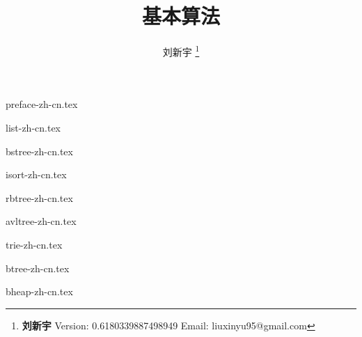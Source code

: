 \documentclass[zihao=5, b5paper, twoside, heading=true]{ctexbook}
\begin{document}


\title{
  {\bf \Huge 基本算法}
  \centering
}

\author{刘新宇
  \thanks{{\bfseries 刘新宇} \newline
    Version: 0.6180339887498949 \newline
    Email: liuxinyu95@gmail.com \newline
    }}

\maketitle


\tableofcontents
\newpage

{preface-zh-cn.tex}

{list-zh-cn.tex}

{bstree-zh-cn.tex}

{isort-zh-cn.tex}

{rbtree-zh-cn.tex}

{avltree-zh-cn.tex}

{trie-zh-cn.tex}

{btree-zh-cn.tex}

{bheap-zh-cn.tex}
\end{document}
